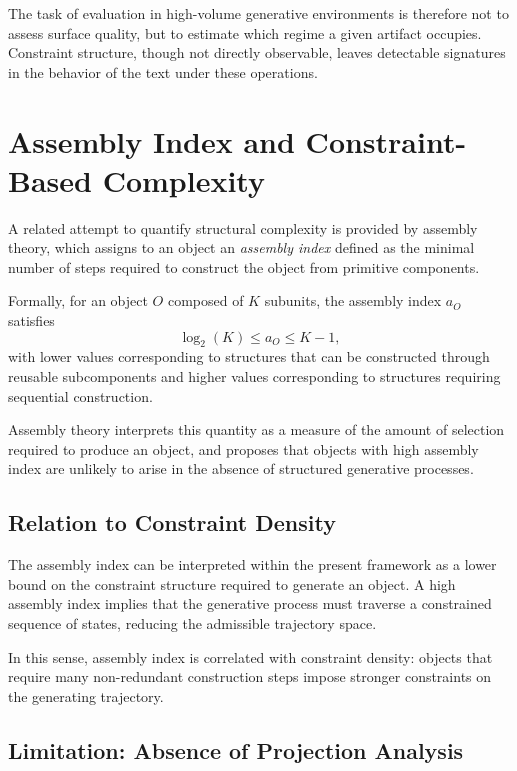 \documentclass[12pt, oneside]{article}
\theoremstyle{plain}
\theoremstyle{definition}
\theoremstyle{remark}
\begin{document}
The task of evaluation in high-volume generative environments is therefore not to
assess surface quality, but to estimate which regime a given artifact occupies.
Constraint structure, though not directly observable, leaves detectable signatures
in the behavior of the text under these operations.

\section{Assembly Index and Constraint-Based Complexity}

A related attempt to quantify structural complexity is provided by assembly theory,
which assigns to an object an \emph{assembly index} defined as the minimal number
of steps required to construct the object from primitive components.

Formally, for an object $O$ composed of $K$ subunits, the assembly index $a_O$
satisfies
\[
  \log_2(K) \leq a_O \leq K - 1,
\]
with lower values corresponding to structures that can be constructed through
reusable subcomponents and higher values corresponding to structures requiring
sequential construction.

Assembly theory interprets this quantity as a measure of the amount of selection
required to produce an object, and proposes that objects with high assembly index
are unlikely to arise in the absence of structured generative processes.

\subsection{Relation to Constraint Density}

The assembly index can be interpreted within the present framework as a lower bound
on the constraint structure required to generate an object. A high assembly index
implies that the generative process must traverse a constrained sequence of states,
reducing the admissible trajectory space.

In this sense, assembly index is correlated with constraint density: objects that
require many non-redundant construction steps impose stronger constraints on the
generating trajectory.

\subsection{Limitation: Absence of Projection Analysis}
\end{document}
